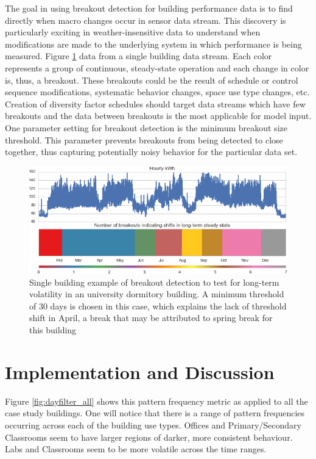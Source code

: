 The goal in using breakout detection for building performance data is to find directly when macro changes occur in sensor data stream. This discovery is particularly exciting in weather-insensitive data to understand when modifications are made to the underlying system in which performance is being measured. Figure \ref{fig:breakout_single} data from a single building data stream. Each color represents a group of continuous, steady-state operation and each change in color is, thus, a breakout. These breakouts could be the result of schedule or control sequence modifications, systematic behavior changes, space use type changes, etc. Creation of diversity factor schedules should target data streams which have few breakouts and the data between breakouts is the most applicable for model input. One parameter setting for breakout detection is the minimum breakout size threshold. This parameter prevents breakouts from being detected to close together, thus capturing potentially noisy behavior for the particular data set.

\begin{figure}[ht!]
\begin{center}
\includegraphics[width=1\columnwidth]{figures/breakout_example/breakout_example}
\caption{Single building example of breakout detection to test for long-term volatility in an university dormitory building. A minimum threshold of 30 days is chosen in this case, which explains the lack of threshold shift in April, a break that may be attributed to spring break for this building
\label{fig:breakout_single}%
}
\end{center}
\end{figure}

\section{Implementation and Discussion}
\label{sec:patternbaseddiscussion}

Figure \ref{fig:dayfilter_all} shows this pattern frequency metric as applied to all the case study buildings. One will notice that there is a range of pattern frequencies occurring across each of the building use types. Offices and Primary/Secondary Classrooms seem to have larger regions of darker, more consistent behaviour. Labs and Classrooms seem to be more volatile across the time ranges.

